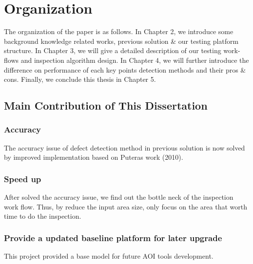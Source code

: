 \section{Organization} \label{section:organization}
	The organization of the paper is as follows. 
	In Chapter 2, we introduce some background knowledge related works, previous solution \& our testing platform structure.
	In Chapter 3, we will give a detailed description of our testing work-flows and inspection algorithm design.
	In Chapter 4, we will further introduce the difference on performance of each key points detection methods and their pros \& cons.
	Finally, we conclude this thesis in Chapter 5.

	\subsection{Main Contribution of This Dissertation} \label{subsec:advantages}
		\subsubsection{Accuracy}
			The accuracy issue of defect detection method in previous solution is now solved by improved implementation based on Puteras work \cite{putera2010printed} (2010).

		\subsubsection{Speed up}
			After solved the accuracy issue, we find out the bottle neck of the inspection work flow. 
			Thus, by reduce the input area size, only focus on the area that worth time to do the inspection.

		\subsubsection{Provide a updated baseline platform for later upgrade}
			This project provided a base model for future AOI tools development.
